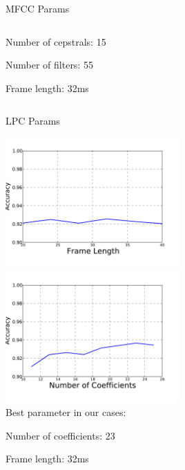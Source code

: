 \begin{frame}{MFCC Params}
\begin{columns}[t]
\begin{column}[t]{0.5\textwidth}
\begin{center}
    Number of cepstrals: 15

    Number of filters: 55

    Frame length: 32ms
  \end{center}
  \end{column}
\end{columns}
\end{frame}

\begin{frame}{LPC Params}
  \begin{center}
    \includegraphics[width=0.5\textwidth]{res/lpc-frame-len.pdf}
    \includegraphics[width=0.5\textwidth]{res/lpc-nceps.pdf}\\
    Best parameter in our cases:

    Number of coefficients: 23

    Frame length: 32ms
  \end{center}
\end{frame}
